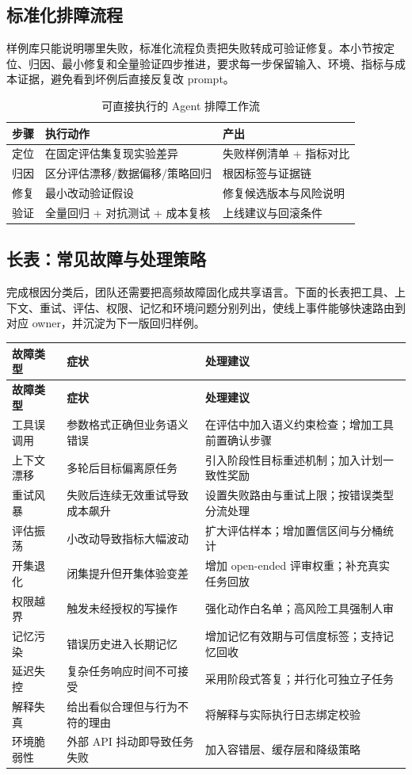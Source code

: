 \documentclass[a4paper]{article}
\begin{document}
\subsection{标准化排障流程}
样例库只能说明哪里失败，标准化流程负责把失败转成可验证修复。本小节按定位、归因、最小修复和全量验证四步推进，要求每一步保留输入、环境、指标与成本证据，避免看到坏例后直接反复改 prompt。
\begin{table}[H]
\centering
\begin{tabular}{p{2.5cm}p{4.2cm}p{4.9cm}}
\toprule
\textbf{步骤} & \textbf{执行动作} & \textbf{产出} \\
\midrule
定位 & 在固定评估集复现实验差异 & 失败样例清单 + 指标对比 \\
归因 & 区分评估漂移/数据偏移/策略回归 & 根因标签与证据链 \\
修复 & 最小改动验证假设 & 修复候选版本与风险说明 \\
验证 & 全量回归 + 对抗测试 + 成本复核 & 上线建议与回滚条件 \\
\bottomrule
\end{tabular}
\caption{可直接执行的 Agent 排障工作流}
\end{table}

\subsection{长表：常见故障与处理策略}
完成根因分类后，团队还需要把高频故障固化成共享语言。下面的长表把工具、上下文、重试、评估、权限、记忆和环境问题分别列出，使线上事件能够快速路由到对应 owner，并沉淀为下一版回归样例。
\begin{longtable}{p{2.7cm}p{4.0cm}p{4.9cm}}
\toprule
\textbf{故障类型} & \textbf{症状} & \textbf{处理建议} \\
\midrule
\endfirsthead
\toprule
\textbf{故障类型} & \textbf{症状} & \textbf{处理建议} \\
\midrule
\endhead
工具误调用 & 参数格式正确但业务语义错误 & 在评估中加入语义约束检查；增加工具前置确认步骤 \\
上下文漂移 & 多轮后目标偏离原任务 & 引入阶段性目标重述机制；加入计划一致性奖励 \\
重试风暴 & 失败后连续无效重试导致成本飙升 & 设置失败路由与重试上限；按错误类型分流处理 \\
评估振荡 & 小改动导致指标大幅波动 & 扩大评估样本；增加置信区间与分桶统计 \\
开集退化 & 闭集提升但开集体验变差 & 增加 open-ended 评审权重；补充真实任务回放 \\
权限越界 & 触发未经授权的写操作 & 强化动作白名单；高风险工具强制人审 \\
记忆污染 & 错误历史进入长期记忆 & 增加记忆有效期与可信度标签；支持记忆回收 \\
延迟失控 & 复杂任务响应时间不可接受 & 采用阶段式答复；并行化可独立子任务 \\
解释失真 & 给出看似合理但与行为不符的理由 & 将解释与实际执行日志绑定校验 \\
环境脆弱性 & 外部 API 抖动即导致任务失败 & 加入容错层、缓存层和降级策略 \\
\bottomrule
\end{longtable}
\end{document}
